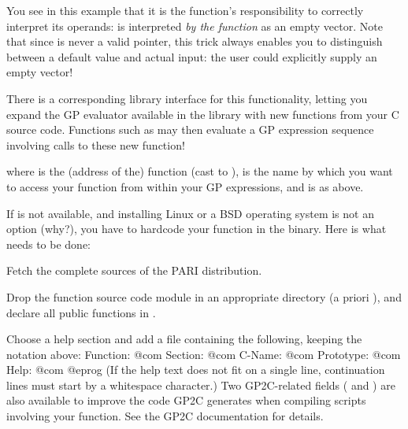  You see in this example that it is the
function's responsibility to correctly interpret its operands:  is interpreted \emph{by the function} as an empty vector. Note that
since  is never a valid  pointer, this trick always
enables you to distinguish between a default value and actual input: the
user could explicitly supply an empty vector!


There is a corresponding library interface for this 
functionality, letting you expand the GP evaluator available in the
library with new functions from your C source code. Functions such as
 may then evaluate a GP expression sequence involving calls
to these new function!


\noindent where  is the (address of the) function (cast to
),  is the name by which you want to access your
function from within your GP expressions, and  is as above.



If  is not available, and installing Linux or a BSD operating
system is not an option (why?), you have to hardcode your function in the
 binary. Here is what needs to be done:

\item Fetch the complete sources of the PARI distribution.

\item Drop the function source code module in an appropriate directory
(a priori ), and declare all public functions
in .

\item Choose a help section and add a file
containing the following, keeping the notation above:
\bprog
Function:  @com
Section:   @com
C-Name:    @com
Prototype: @com
Help:      @com
@eprog\noindent
(If the help text does not fit on a single line, continuation lines must
start by a whitespace character.) Two GP2C-related fields (
and ) are also available to improve the code GP2C generates when
compiling scripts involving your function. See the GP2C documentation for
details.


